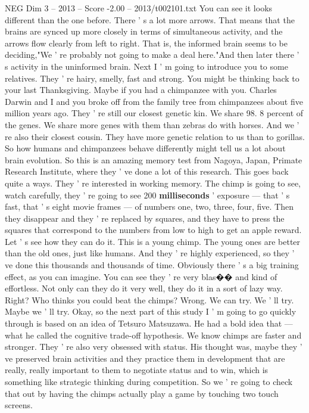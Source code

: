 \begin{textsample}{NEG Dim 3 – 2013 – Score -2.00 – 2013/t002101.txt}
You can see it looks different than the one before.
There ' s a lot more arrows.
That means that the brains are synced up more closely in terms of simultaneous activity, and the arrows flow clearly from left to right.
That is, the informed brain seems to be deciding,"We ' re probably not going to make a deal here."And then later there ' s activity in the uninformed brain.
Next I ' m going to introduce you to some relatives.
They ' re hairy, smelly, fast and strong.
You might be thinking back to your last Thanksgiving.
Maybe if you had a chimpanzee with you.
Charles Darwin and I and you broke off from the family tree from chimpanzees about five million years ago.
They ' re still our closest genetic kin.
We share 98. 8 percent of the genes.
We share more genes with them than zebras do with horses.
And we ' re also their closest cousin.
They have more genetic relation to us than to gorillas.
So how humans and chimpanzees behave differently might tell us a lot about brain evolution.
So this is an amazing memory test from Nagoya, Japan, Primate Research Institute, where they ' ve done a lot of this research.
This goes back quite a ways.
They ' re interested in working memory.
The chimp is going to see, watch carefully, they ' re going to see 200 \textbf{milliseconds} ' exposure — that ' s fast, that ' s eight movie frames — of numbers one, two, three, four, five.
Then they disappear and they ' re replaced by squares, and they have to press the squares that correspond to the numbers from low to high to get an apple reward.
Let ' s see how they can do it.
This is a young chimp.
The young ones are better than the old ones, just like humans.
And they ' re highly experienced, so they ' ve done this thousands and thousands of time.
Obviously there ' s a big training effect, as you can imagine.
You can see they ' re very blas{\EmojiFont �}{\EmojiFont �} and kind of effortless.
Not only can they do it very well, they do it in a sort of lazy way.
Right?
Who thinks you could beat the chimps?
Wrong.
We can try.
We ' ll try.
Maybe we ' ll try.
Okay, so the next part of this study I ' m going to go quickly through is based on an idea of Tetsuro Matsuzawa.
He had a bold idea that — what he called the cognitive trade-off hypothesis.
We know chimps are faster and stronger.
They ' re also very obsessed with status.
His thought was, maybe they ' ve preserved brain activities and they practice them in development that are really, really important to them to negotiate status and to win, which is something like strategic thinking during competition.
So we ' re going to check that out by having the chimps actually play a game by touching two touch screens.

\end{textsample}
